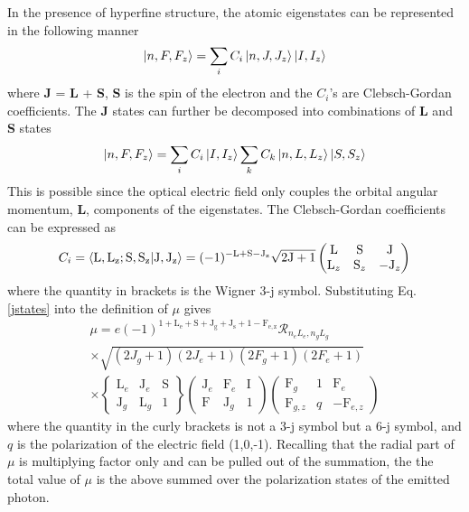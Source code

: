 \documentclass[12pt,a4paper,margin=1in]{report}
\begin{document}
In the presence of hyperfine structure, the atomic eigenstates can be represented in the following manner
\begin{equation}
\ket{n,F,F_z} = \sum_iC_i\ket{n,J,J_z}\ket{I,I_z}
\label{jstates}
\end{equation}
where \textbf{J}  =\textbf{ L} + \textbf{S}, \textbf{S} is the spin of the electron and the $C_i$'s are Clebsch-Gordan coefficients. The \textbf{J} states can further be decomposed into combinations of \textbf{L} and \textbf{S} states
\begin{equation}
\ket{n,F,F_z} = \sum_iC_i\ket{I,I_z}\sum_kC_k\ket{n,L,L_z}\ket{S,S_z}
\label{jstates}
\end{equation}
This is possible since the optical electric field only couples the orbital angular momentum, \textbf{L}, components of the eigenstates.  The Clebsch-Gordan coefficients can be expressed as
\begin{equation}
C_i = \braket{\mathrm{L,L_z ; S,S_z}|\mathrm{J,J_z}}=(-1)^{\mathrm{-L+S-J_z}}\sqrt{\mathrm{2J+1}}
\left(
\begin{matrix}
\mathrm{L} & \mathrm{S} & \mathrm{J}\\
\mathrm{L}_z & \mathrm{S}_z & -\mathrm{J}_z
\end{matrix}
\right)
\end{equation}
where the quantity in brackets is the Wigner 3-j symbol.
Substituting Eq. \ref{jstates} into the definition of $\mu$ gives 
\begin{equation}
\begin{split}
\mu = e (-1)^{\mathrm{1+L_e+S+J_g+J_s+1-F_{e,z}}}\mathcal{R}_{n_e L_e, n_g L_g}\\
\times \sqrt{(2J_g+1)(2J_e+1)(2F_g+1)(2F_e+1)}\\
\times \left\lbrace
\begin{matrix}
\mathrm{L}_e & \mathrm{J}_e & \mathrm{S}\\
\mathrm{J}_g & \mathrm{L}_g & 1
\end{matrix}
\right\rbrace
\left(
\begin{matrix}
\mathrm{J}_e & \mathrm{F}_e & \mathrm{I}\\
\mathrm{F} & \mathrm{J}_g &1
\end{matrix}
\right)
\left(
\begin{matrix}
\mathrm{F}_g & 1 & \mathrm{F}_e\\
\mathrm{F}_{g,z} & q &-\mathrm{F}_{e,z}
\end{matrix}
\right)
\end{split}
\end{equation}
where the quantity in the curly brackets is not a 3-j symbol but a 6-j symbol, and $q$ is the polarization of the electric field (1,0,-1). Recalling that the radial part of $\mu$ is multiplying factor only and can be pulled out of the summation, the the total value of $\mu$ is the above summed over the polarization states of the emitted photon.
\end{document}
